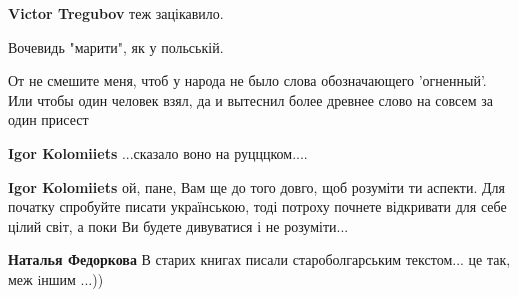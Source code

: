 \begin{itemize}
\begin{itemize}
\textbf{Victor Tregubov} теж зацікавило.

 
Вочевидь "марити", як у польській.

 

От не смешите меня, чтоб у народа не было слова обозначающего 'огненный'. Или
чтобы один человек взял, да и вытеснил более древнее слово на совсем за один
присест

 
\textbf{Igor Kolomiiets} ...сказало воно на руцццком....

 
\textbf{Igor Kolomiiets} ой, пане, Вам ще до того довго, щоб розуміти ти аспекти. Для початку спробуйте писати українською, тоді потроху почнете відкривати для себе цілий світ, а поки Ви будете дивуватися і не розуміти...

 
\textbf{Наталья Федоркова} В старих книгах писали староболгарським текстом... це так, меж iншим ...))

 

\end{itemize}
\end{itemize}
